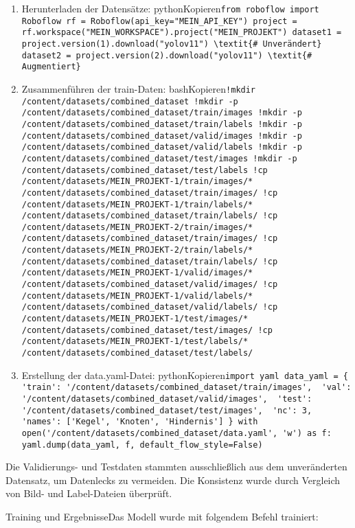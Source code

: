\begin{enumerate} 
    \item Herunterladen der Datensätze: pythonKopieren\verb|from roboflow import Roboflow rf = Roboflow(api_key="MEIN_API_KEY") project = rf.workspace("MEIN_WORKSPACE").project("MEIN_PROJEKT") dataset1 = project.version(1).download("yolov11") \textit{# Unverändert} dataset2 = project.version(2).download("yolov11") \textit{# Augmentiert}|  
    \item Zusammenführen der train-Daten: bashKopieren\verb|!mkdir /content/datasets/combined_dataset !mkdir -p /content/datasets/combined_dataset/train/images !mkdir -p /content/datasets/combined_dataset/train/labels !mkdir -p /content/datasets/combined_dataset/valid/images !mkdir -p /content/datasets/combined_dataset/valid/labels !mkdir -p /content/datasets/combined_dataset/test/images !mkdir -p /content/datasets/combined_dataset/test/labels !cp /content/datasets/MEIN_PROJEKT-1/train/images/* /content/datasets/combined_dataset/train/images/ !cp /content/datasets/MEIN_PROJEKT-1/train/labels/* /content/datasets/combined_dataset/train/labels/ !cp /content/datasets/MEIN_PROJEKT-2/train/images/* /content/datasets/combined_dataset/train/images/ !cp /content/datasets/MEIN_PROJEKT-2/train/labels/* /content/datasets/combined_dataset/train/labels/ !cp /content/datasets/MEIN_PROJEKT-1/valid/images/* /content/datasets/combined_dataset/valid/images/ !cp /content/datasets/MEIN_PROJEKT-1/valid/labels/* /content/datasets/combined_dataset/valid/labels/ !cp /content/datasets/MEIN_PROJEKT-1/test/images/* /content/datasets/combined_dataset/test/images/ !cp /content/datasets/MEIN_PROJEKT-1/test/labels/* /content/datasets/combined_dataset/test/labels/|  
    \item Erstellung der data.yaml-Datei: pythonKopieren\verb|import yaml data_yaml = {  'train': '/content/datasets/combined_dataset/train/images',  'val': '/content/datasets/combined_dataset/valid/images',  'test': '/content/datasets/combined_dataset/test/images',  'nc': 3,  'names': ['Kegel', 'Knoten', 'Hindernis'] } with open('/content/datasets/combined_dataset/data.yaml', 'w') as f:  yaml.dump(data_yaml, f, default_flow_style=False)|  
\end{enumerate}
Die Validierungs- und Testdaten stammten ausschließlich aus dem unveränderten Datensatz, um Datenlecks zu vermeiden. Die Konsistenz wurde durch Vergleich von Bild- und Label-Dateien überprüft.

Training und ErgebnisseDas Modell wurde mit folgendem Befehl trainiert:

